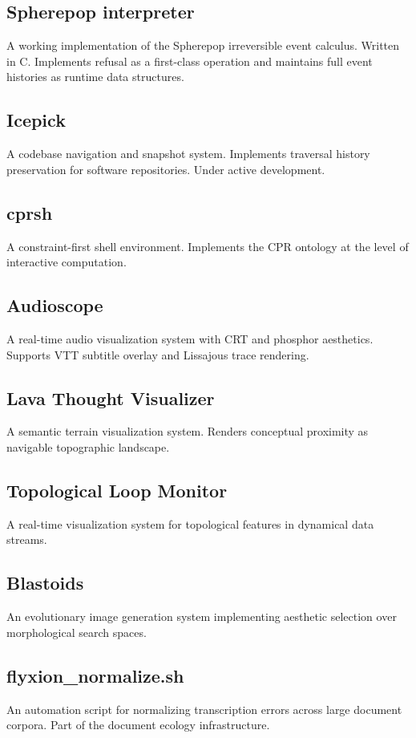 \documentclass[12pt, openany]{book}
\begin{document}
\subsection{Spherepop interpreter} A working implementation of the
Spherepop irreversible event calculus. Written in C. Implements refusal
as a first-class operation and maintains full event histories as
runtime data structures.

\subsection{Icepick} A codebase navigation and snapshot system. Implements
traversal history preservation for software repositories. Under active
development.

\subsection{cprsh} A constraint-first shell environment. Implements the
CPR ontology at the level of interactive computation.

\subsection{Audioscope} A real-time audio visualization system with CRT
and phosphor aesthetics. Supports VTT subtitle overlay and Lissajous
trace rendering.

\subsection{Lava Thought Visualizer} A semantic terrain visualization
system. Renders conceptual proximity as navigable topographic landscape.

\subsection{Topological Loop Monitor} A real-time visualization system
for topological features in dynamical data streams.

\subsection{Blastoids} An evolutionary image generation system implementing
aesthetic selection over morphological search spaces.

\subsection{flyxion\_normalize.sh} An automation script for normalizing
transcription errors across large document corpora. Part of the document
ecology infrastructure.
\end{document}
